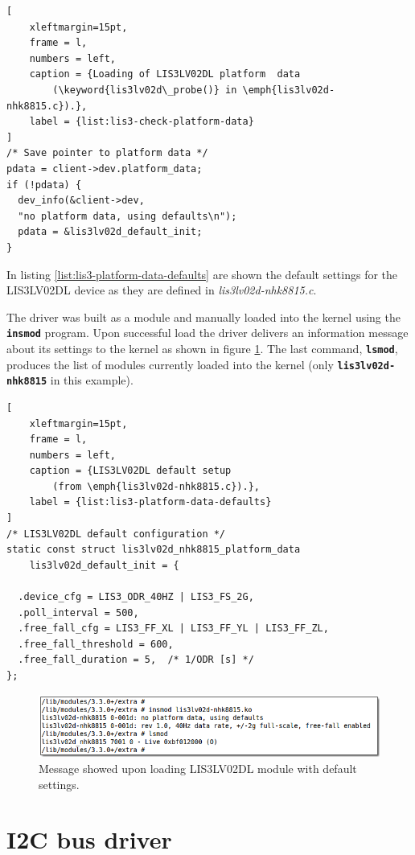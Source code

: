 \documentclass[a4paper,10pt]{article}
\newcommand{\keyword}[1]{\texttt{\textbf{#1}}}
\begin{document}
\begin{multicols}{2}
\begin{lstlisting}[
	xleftmargin=15pt,
	frame = l,
	numbers = left,
	caption = {Loading of LIS3LV02DL platform  data
		(\keyword{lis3lv02d\_probe()} in \emph{lis3lv02d-nhk8815.c}).},
	label = {list:lis3-check-platform-data}
]
/* Save pointer to platform data */
pdata = client->dev.platform_data;
if (!pdata) {
  dev_info(&client->dev,
  "no platform data, using defaults\n");
  pdata = &lis3lv02d_default_init;
}
\end{lstlisting}

In listing \ref{list:lis3-platform-data-defaults} are shown the default settings
for the LIS3LV02DL device as they are defined in \emph{lis3lv02d-nhk8815.c}.

The driver was built as a module and manually loaded into the kernel using the
\keyword{insmod} program. Upon successful load the driver delivers an information
message about its settings to the kernel as shown in figure \ref{fig:lis3-insmod}.
The last command, \keyword{lsmod}, produces the list of modules currently loaded
into the kernel (only \keyword{lis3lv02d-nhk8815} in this example).

\begin{lstlisting}[
	xleftmargin=15pt,
	frame = l,
	numbers = left,
	caption = {LIS3LV02DL default setup
		(from \emph{lis3lv02d-nhk8815.c}).},
	label = {list:lis3-platform-data-defaults}
]
/* LIS3LV02DL default configuration */
static const struct lis3lv02d_nhk8815_platform_data
	lis3lv02d_default_init = {

  .device_cfg = LIS3_ODR_40HZ | LIS3_FS_2G,
  .poll_interval = 500,
  .free_fall_cfg = LIS3_FF_XL | LIS3_FF_YL | LIS3_FF_ZL,
  .free_fall_threshold = 600,
  .free_fall_duration = 5,	/* 1/ODR [s] */
};
\end{lstlisting}

\begin{figure}
 \includegraphics[width=11.8cm]{./figures/dump-lis3lv02d-insmod.png}
 \caption{Message showed upon loading LIS3LV02DL module with default settings.}
 \label{fig:lis3-insmod}
\end{figure}



\section{I2C bus driver}
\label{sec:i2c_bus_driver}


\end{multicols}
\end{document}
